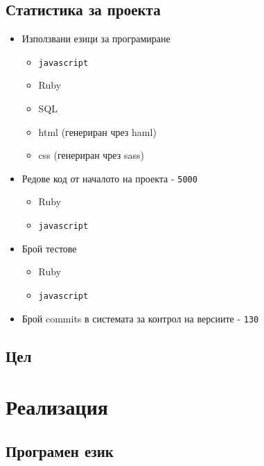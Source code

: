 \documentclass[a4paper]{article}
\def\js{\texttt{javascript}}
\begin{document}
  \subsection{Статистика за проекта}
  \begin{itemize}
    \item Използвани езици за програмиране
    \begin{itemize}
      \item \js
      \item Ruby
      \item SQL
      \item html (генериран чрез haml)
      \item css (генериран чрез sass)
    \end{itemize}
    
    \item Редове код от началото на проекта - \texttt{5000}
    \begin{itemize}
      \item Ruby 
      \item \js {}
    \end{itemize}


    \item Брой тестове
    \begin{itemize}
      \item Ruby 
      \item \js {}
    \end{itemize}

    \item Брой commits в системата за контрол на версиите - \texttt{130}
  \end{itemize}

  \subsection{Цел}

\section{Реализация}

\subsection{Програмен език}
\end{document}
